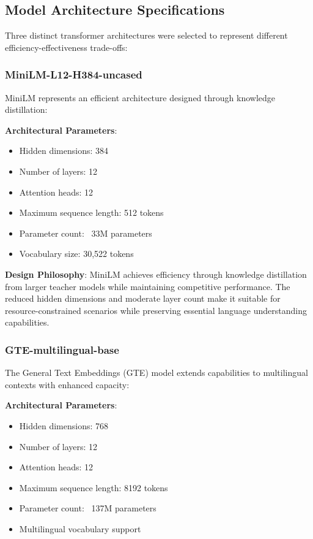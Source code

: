 \subsection{Model Architecture Specifications}

Three distinct transformer architectures were selected to represent different efficiency-effectiveness trade-offs:

\subsubsection{MiniLM-L12-H384-uncased}

MiniLM \cite{wang2020minilm} represents an efficient architecture designed through knowledge distillation:

\textbf{Architectural Parameters}:
\begin{itemize}
    \item Hidden dimensions: 384
    \item Number of layers: 12
    \item Attention heads: 12
    \item Maximum sequence length: 512 tokens
    \item Parameter count: ~33M parameters
    \item Vocabulary size: 30,522 tokens
\end{itemize}

\textbf{Design Philosophy}: MiniLM achieves efficiency through knowledge distillation from larger teacher models while maintaining competitive performance. The reduced hidden dimensions and moderate layer count make it suitable for resource-constrained scenarios while preserving essential language understanding capabilities.

\subsubsection{GTE-multilingual-base}

The General Text Embeddings (GTE) model \cite{li2023towards} extends capabilities to multilingual contexts with enhanced capacity:

\textbf{Architectural Parameters}:
\begin{itemize}
    \item Hidden dimensions: 768
    \item Number of layers: 12
    \item Attention heads: 12
    \item Maximum sequence length: 8192 tokens
    \item Parameter count: ~137M parameters
    \item Multilingual vocabulary support
\end{itemize}

